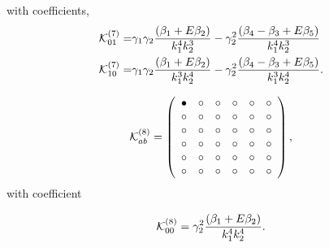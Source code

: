 with coefficients, 
\begin{align*}
\mathcal{K}_{01}^{(7)}=& \gamma_1 \gamma_2 \frac{\left( \beta_1 + E \beta_2 \right)}{k_1^4 k_2^3} - \gamma_2^2 \frac{\left( {\beta_{4}-\beta_{3}} + E \beta_{5}\right) }{k_1^4 k_2^3} \\
\mathcal{K}_{10}^{(7)}=& \gamma_1 \gamma_2 \frac{\left( \beta_1 + E \beta_2 \right)}{k_1^3 k_2^4} - \gamma_2^2 \frac{\left( {\beta_{4}-\beta_{3}} + E \beta_{5} \right)}{k_1^3 k_2^4} .
\end{align*}


\begin{equation}
	\mathcal{K}^{(8)}_{ab}= 
 \left( \begin {array}{cccccc} \bullet &\circ &\circ &\circ &
\circ &\circ \\  \circ &\circ &\circ &
\circ &\circ &\circ \\  \circ &\circ &
\circ &\circ &\circ &\circ \\  \circ &
\circ &\circ &\circ &\circ &\circ \\  
\circ &\circ &\circ &\circ &\circ &\circ 
\\  \circ &\circ &\circ &\circ &\circ &
\circ \end {array} \right) , 
\end{equation}
with coefficient

\begin{equation*}
	\mathcal{K}_{00}^{(8)}= \gamma_2^2 \frac{\left( \beta_1 + E \beta_2 \right)}{k_1^4 k_2^4}.
\end{equation*}

